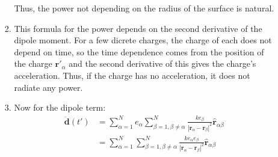 \documentclass[12pt,a4]{article}
\begin{document}
\begin{enumerate}
\begin{enumerate}
\begin{enumerate}
            Thus, the power not depending on the radius of the surface is natural.
          \item
            This formula for the power depends on the second derivative of the dipole moment.
            For a few dicrete charges, the charge of each does not depend on time, so the time dependence comes from the position of the charge $\mathbf{r}'_\alpha$ and the second derivative of this gives the charge's acceleration.
            Thus, if the charge has no acceleration, it does not radiate any power.
          \item
            Now for the dipole term:
            \begin{align*}
              \ddot{\mathbf{d}}(t') &= \sum_{\alpha = 1}^{N} e_\alpha \sum_{\beta = 1, \beta \neq \alpha }^N \frac{k e_\beta }{|\mathbf{r}_\alpha - \mathbf{r}_\beta|^2} \hat{\mathbf{r}}_{\alpha\beta}\\
                                    &= \sum_{\alpha = 1}^{N} \sum_{\beta = 1, \beta \neq \alpha }^N \frac{k e_\alpha e_\beta }{|\mathbf{r}_\alpha - \mathbf{r}_\beta|^2} \hat{\mathbf{r}}_{\alpha\beta}\\

\end{align*}
\end{enumerate}
\end{enumerate}
\end{enumerate}
\end{document}
